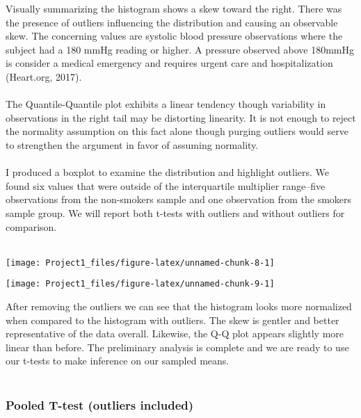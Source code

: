 \documentclass[
]{article}
\begin{document}
Visually summarizing the histogram shows a skew toward the right. There
was the presence of outliers influencing the distribution and causing an
observable skew. The concerning values are systolic blood pressure
observations where the subject had a 180 mmHg reading or higher. A
pressure observed above 180mmHg is consider a medical emergency and
requires urgent care and hospitalization (Heart.org, 2017).\\
~\\
The Quantile-Quantile plot exhibits a linear tendency though variability
in observations in the right tail may be distorting linearity. It is not
enough to reject the normality assumption on this fact alone though
purging outliers would serve to strengthen the argument in favor of
assuming normality.\\
~\\
I produced a boxplot to examine the distribution and highlight outliers.
We found six values that were outside of the interquartile multiplier
range--five observations from the non-smokers sample and one observation
from the smokers sample group. We will report both t-tests with outliers
and without outliers for comparison.\\
~\\

\begin{center}\texttt{[image: Project1\_files/figure-latex/unnamed-chunk-8-1]} \end{center}

\hfill\break
\hfill\break

\begin{center}\texttt{[image: Project1\_files/figure-latex/unnamed-chunk-9-1]} \end{center}

\hfill\break
\hfill\break
After removing the outliers we can see that the histogram looks more
normalized when compared to the histogram with outliers. The skew is
gentler and better representative of the data overall. Likewise, the Q-Q
plot appears slightly more linear than before. The preliminary analysis
is complete and we are ready to use our t-tests to make inference on our
sampled means.\\
~\\

\hypertarget{pooled-t-test-outliers-included}{%
\subsubsection{Pooled T-test (outliers
included)}\label{pooled-t-test-outliers-included}}
\end{document}
